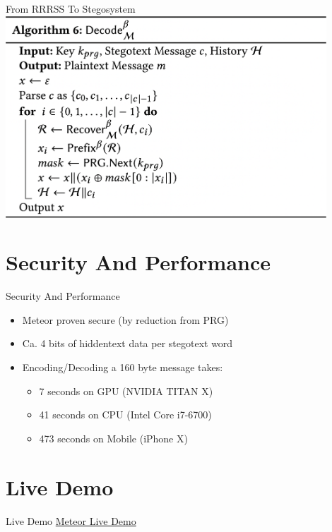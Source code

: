 \documentclass[10pt]{beamer}
\begin{document}
    \begin{frame}{From RRRSS To Stegosystem}
        \centering
        \includegraphics[width=0.9\textwidth]{alg-decode.png}
    \end{frame}
    
    \section{Security And Performance}
    
    \begin{frame}{Security And Performance}
        \begin{itemize}[<+- | alert@+>]
            \item Meteor proven secure (by reduction from PRG)
            \item Ca. 4 bits of hiddentext data per stegotext word
            \item Encoding/Decoding a 160 byte message takes:
                \begin{itemize}
                    \item 7 seconds on GPU (NVIDIA TITAN X)
                    \item 41 seconds on CPU (Intel Core i7-6700)
                    \item 473 seconds on Mobile (iPhone X)
                \end{itemize}
        \end{itemize}
    \end{frame}
    
    \section{Live Demo}
    
    \begin{frame}{Live Demo}
        \centering
        \href{https://colab.research.google.com/gist/tusharjois/ec8603b711ff61e09167d8fef37c9b86}{Meteor Live Demo}
    \end{frame}
    
\end{document}
